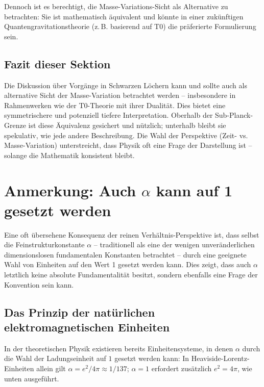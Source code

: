 Dennoch ist es berechtigt, die Masse-Variations-Sicht als Alternative zu betrachten: Sie ist mathematisch äquivalent und könnte in einer zukünftigen Quantengravitationstheorie (z.\,B. basierend auf T0) die präferierte Formulierung sein.

\subsection{Fazit dieser Sektion}

Die Diskussion über Vorgänge in Schwarzen Löchern kann und sollte auch als alternative Sicht der Masse-Variation betrachtet werden – insbesondere in Rahmenwerken wie der T0-Theorie mit ihrer Dualität. Dies bietet eine symmetrischere und potenziell tiefere Interpretation. Oberhalb der Sub-Planck-Grenze ist diese Äquivalenz gesichert und nützlich; unterhalb bleibt sie spekulativ, wie jede andere Beschreibung. Die Wahl der Perspektive (Zeit- vs. Masse-Variation) unterstreicht, dass Physik oft eine Frage der Darstellung ist – solange die Mathematik konsistent bleibt.
\section{Anmerkung: Auch \(\alpha\) kann auf 1 gesetzt werden}

Eine oft übersehene Konsequenz der reinen Verhältnis-Perspektive ist, dass selbst die Feinstrukturkonstante \(\alpha\) – traditionell als eine der wenigen unveränderlichen dimensionslosen fundamentalen Konstanten betrachtet – durch eine geeignete Wahl von Einheiten auf den Wert 1 gesetzt werden kann. Dies zeigt, dass auch \(\alpha\) letztlich keine absolute Fundamentalität besitzt, sondern ebenfalls eine Frage der Konvention sein kann.

\subsection{Das Prinzip der natürlichen elektromagnetischen Einheiten}

In der theoretischen Physik existieren bereits Einheitensysteme, in denen \(\alpha\) durch die Wahl der Ladungseinheit auf \(1\) gesetzt werden kann: In Heaviside-Lorentz-Einheiten allein gilt \(\alpha = e^2/4\pi \approx 1/137\); \(\alpha = 1\) erfordert zusätzlich \(e^2 = 4\pi\), wie unten ausgeführt.

